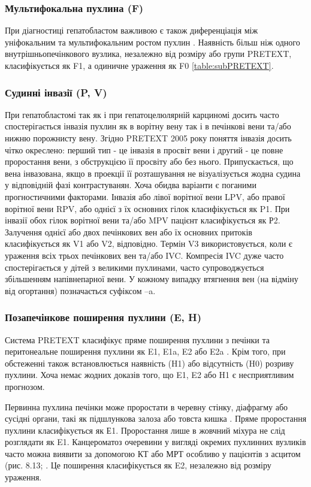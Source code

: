 \subsubsection{Мультифокальна пухлина (F)}
При діагностиці гепатобластом важливою є також диференціація між уніфокальним та мультифокальним ростом пухлин \cite{pmid24132546}. Наявність більш ніж одного внутрішньопечінкового вузлика, незалежно від розміру або групи PRETEXT, класифікується як F1, а одиничне ураження як F0 \ref{table:subPRETEXT}.
\subsubsection{Судинні інвазії (P, V)}
При гепатобластомі так як і при гепатоцелюлярній карциномі досить часто спостерігається інвазія пухлин як в ворітну вену так і в печінкові вени та/або нижню порожнисту вену. Згідно PRETEXT 2005 року поняття інвазія досить чітко окреслено: перший тип - це інвазія в просвіт вени і другий - це повне проростання вени, з обструкцією її просвіту або без нього. Припускається, що вена інвазована, якщо в проекції її розташування не візуалізується жодна судина у відповідній фазі контрастуванян. Хоча обидва варіанти є поганими прогностичними факторами. 
Інвазія або лівої ворітної вени LPV, або правої ворітної вени RPV, або однієї з їх основних гілок класифікується як P1. При інвазії обох гілок ворітної вени та/або MPV пацієнт класифікується як Р2.
Залучення однієї або двох печінкових вен або їх основних притоків класифікується як V1 або V2, відповідно. Термін V3 використовується, коли є ураження всіх трьох печінкових вен та/або IVC. Компресія IVC дуже часто спостерігається у дітей з великими пухлинами, часто супроводжується збільшенням напівнепарної вени.
У кожному випадку втягнення вен (на відміну від огортання) позначається суфіксом –a.
\subsubsection{Позапечінкове поширення пухлини (E, H)}
Система PRETEXT класифікує пряме поширення пухлини з печінки та перитонеальне поширення пухлини як E1, E1a, E2 або E2a \cite{pmid23217875}. Крім того, при обстеженні також встановлюється наявність (H1) або відсутність (H0) розриву пухлини. Хоча немає жодних доказів того, що E1, E2 або H1 є несприятливим прогнозом.

Первинна пухлина печінки може проростати в черевну стінку, діафрагму або сусідні органи, такі як підшлункова залоза або товста кишка \cite{pmid23331862}. Пряме проростання пухлини класифікується як Е1. Проростання лише в жовчний міхура не слід розглядати як E1.
Канцероматоз очеревини у вигляді окремих пухлинних вузликів часто можна виявити за допомогою КТ або МРТ особливо у пацієнтів з асцитом (рис. 8.13; \cite{pmid23831416}. Це поширення класифікується як E2, незалежно від розміру ураження.


